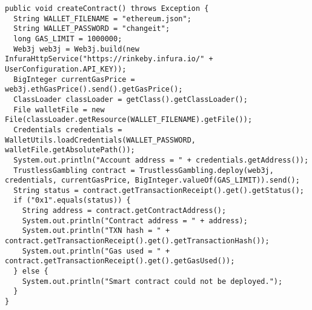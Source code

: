 \begin{lstlisting}[basicstyle=\small]
public void createContract() throws Exception {
  String WALLET_FILENAME = "ethereum.json";
  String WALLET_PASSWORD = "changeit";
  long GAS_LIMIT = 1000000;
  Web3j web3j = Web3j.build(new InfuraHttpService("https://rinkeby.infura.io/" + UserConfiguration.API_KEY));
  BigInteger currentGasPrice = web3j.ethGasPrice().send().getGasPrice();
  ClassLoader classLoader = getClass().getClassLoader();
  File walletFile = new File(classLoader.getResource(WALLET_FILENAME).getFile());
  Credentials credentials = WalletUtils.loadCredentials(WALLET_PASSWORD, walletFile.getAbsolutePath());
  System.out.println("Account address = " + credentials.getAddress());
  TrustlessGambling contract = TrustlessGambling.deploy(web3j, credentials, currentGasPrice, BigInteger.valueOf(GAS_LIMIT)).send();
  String status = contract.getTransactionReceipt().get().getStatus();
  if ("0x1".equals(status)) {
    String address = contract.getContractAddress();
    System.out.println("Contract address = " + address);
    System.out.println("TXN hash = " + contract.getTransactionReceipt().get().getTransactionHash());
    System.out.println("Gas used = " + contract.getTransactionReceipt().get().getGasUsed());
  } else {
    System.out.println("Smart contract could not be deployed.");
  }
}
\end{lstlisting}